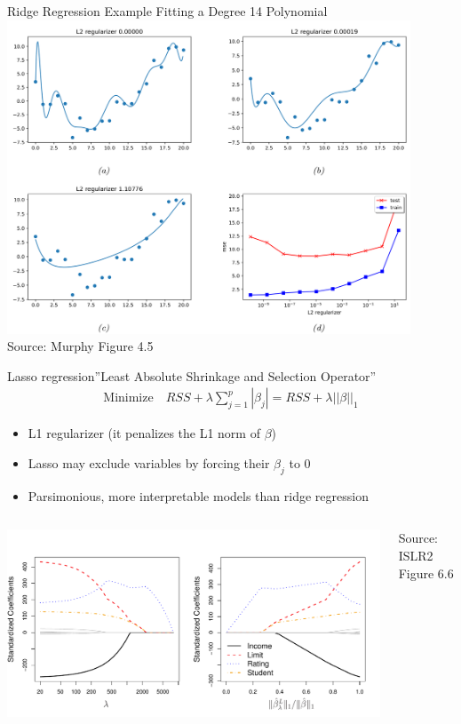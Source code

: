 \documentclass[ignorenonframetext,xcolor=x11names]{beamer}
\begin{document}
\begin{frame}{Ridge Regression Example }{Fitting a Degree 14 Polynomial}
\centering
\includegraphics[width=0.9\textwidth]{screen4.png}\\
\scriptsize Source: Murphy Figure 4.5
\end{frame}

\begin{frame}{Lasso regression}{''Least Absolute Shrinkage and Selection Operator''}
\begin{align*}
\text{Minimize} \quad RSS + \lambda \sum_{j=1}^p |\beta_j| = RSS + \lambda ||\beta||_1
\end{align*}
\begin{itemize}
   \item L1 regularizer (it penalizes the L1 norm of $\beta$)
   \item Lasso may exclude variables by forcing their $\beta_j$ to 0
   \item Parsimonious, more interpretable models than ridge regression
\end{itemize}
\begin{columns}
\begin{column}{0.8\textwidth}
\includegraphics[width=\textwidth]{../class11/Figures_Chapters_1-6/Chapter6/6_6.pdf}
\end{column}
\begin{column}{0.2\textwidth}
\scriptsize Source: ISLR2 Figure 6.6
\end{column}
\end{columns}
\end{frame}
\end{document}

